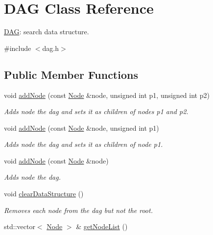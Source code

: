 \hypertarget{classDAG}{}\section{D\+AG Class Reference}
\label{classDAG}


\hyperlink{classDAG}{D\+AG}\+: search data structure.  




{\ttfamily \#include $<$dag.\+h$>$}

\subsection*{Public Member Functions}
\begin{DoxyCompactItemize}
\item 
void \hyperlink{classDAG_aed6fe76f8e3400755b063bc0d0152955}{add\+Node} (const \hyperlink{classNode}{Node} \&node, unsigned int p1, unsigned int p2)
\begin{DoxyCompactList}\small\item\em Adds node the dag and sets it as children of nodes p1 and p2. \end{DoxyCompactList}\item 
void \hyperlink{classDAG_ac0ca03d85f1bd95c9e2dd092923d21ed}{add\+Node} (const \hyperlink{classNode}{Node} \&node, unsigned int p1)
\begin{DoxyCompactList}\small\item\em Adds node the dag and sets it as children of node p1. \end{DoxyCompactList}\item 
void \hyperlink{classDAG_a88682a026a8f2931dbe64fc5085430ec}{add\+Node} (const \hyperlink{classNode}{Node} \&node)
\begin{DoxyCompactList}\small\item\em Adds node the dag. \end{DoxyCompactList}\item 
\mbox{\label{classDAG_a04bf7ea8f5319b8dbcf2814d5c42e292}} 
void \hyperlink{classDAG_a04bf7ea8f5319b8dbcf2814d5c42e292}{clear\+Data\+Structure} ()
\begin{DoxyCompactList}\small\item\em Removes each node from the dag but not the root. \end{DoxyCompactList}\item 
std\+::vector$<$ \hyperlink{classNode}{Node} $>$ \& \hyperlink{classDAG_af8afaefe800c1eb05ef631e148692c2d}{get\+Node\+List} ()

\end{DoxyCompactItemize}
